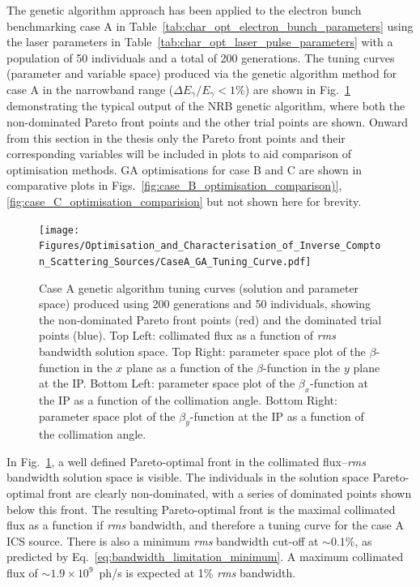 \documentclass[../main.tex]{subfiles}
\begin{document}
The genetic algorithm approach has been applied to the electron bunch benchmarking case A in Table~\ref{tab:char_opt_electron_bunch_parameters} using the laser parameters in Table~\ref{tab:char_opt_laser_pulse_parameters} with a population of 50 individuals and a total of 200 generations. The tuning curves (parameter and variable space) produced via the genetic algorithm method for case A in the narrowband range ($\Delta E_{\gamma}/E_{\gamma}<1\%$) are shown in Fig.~\ref{fig:case_A_GA_tuning_curves} demonstrating the typical output of the NRB genetic algorithm, where both the non-dominated Pareto front points and the other trial points are shown. Onward from this section in the thesis only the Pareto front points and their corresponding variables will be included in plots to aid comparison of optimisation methods. GA optimisations for case B and C are shown in comparative plots in Figs.~\ref{fig:case_B_optimisation_comparison)}, \ref{fig:case_C_optimisation_comparision} but not shown here for brevity. 
\begin{figure}[!h]
\centering
\texttt{[image: Figures/Optimisation\_and\_Characterisation\_of\_Inverse\_Compton\_Scattering\_Sources/CaseA\_GA\_Tuning\_Curve.pdf]}
\caption{Case A genetic algorithm tuning curves (solution and parameter space) produced using 200 generations and 50 individuals, showing the non-dominated Pareto front points (red) and the dominated trial points (blue). Top Left: collimated flux as a function of \textit{rms} bandwidth solution space. Top Right: parameter space plot of the $\beta$-function in the $x$ plane as a function of the $\beta$-function in the $y$ plane at the IP. Bottom Left: parameter space plot of the $\beta_{x}$-function at the IP as a function of the collimation angle. Bottom Right: parameter space plot of the $\beta_{y}$-function at the IP as a function of the collimation angle.}
\label{fig:case_A_GA_tuning_curves}
\end{figure}

In Fig.~\ref{fig:case_A_GA_tuning_curves}, a well defined Pareto-optimal front in the collimated flux--\textit{rms} bandwidth solution space is visible. The individuals in the solution space Pareto-optimal front are clearly non-dominated, with a series of dominated points shown below this front. The resulting Pareto-optimal front is the maximal collimated flux as a function if \textit{rms} bandwidth, and therefore a tuning curve for the case A ICS source. There is also a minimum \textit{rms} bandwidth cut-off at $\sim 0.1$\%, as predicted by Eq.~\ref{eq:bandwidth_limitation_minimum}. A maximum collimated flux of $\sim 1.9\times 10^{9}$~ph/\si{\second} is expected at 1\% \textit{rms} bandwidth.
\end{document}
